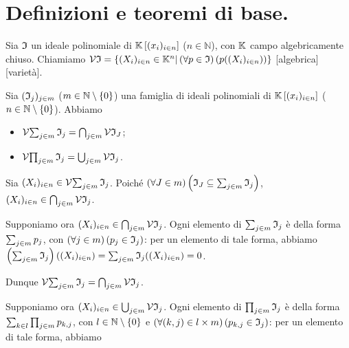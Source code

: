 \section{Definizioni e teoremi di base.}
\label{VarietaAlgebriche_DefinizioniETeoremiDiBase}
\begin{Definition}
	Sia $\mathfrak{I}$ un ideale polinomiale di $\mathbb{K} \left [ (x_i)_{i \in n} \right ]$ ($n \in \mathbb{N}$), con $\mathbb{K}$ campo algebricamente chiuso. Chiamiamo $\AlgebraicManifold{\PolynomialIdeal} = \lbrace (X_i)_{i \in n} \in \Field^n | \ForAll{\Polynomial \in \PolynomialIdeal}{\Polynomial((X_i)_{i \in n})} \rbrace$ [algebrica][variet\`a].
\end{Definition}
\begin{Theorem}
	Sia $(\mathfrak{I}_j)_{j \in m}$ ($m \in \mathbb{N} \setminus \lbrace 0 \rbrace$) una famiglia di ideali polinomiali di $\mathbb{K} \left [ (x_i)_{i \in n} \right ]$ ($n \in \mathbb{N} \setminus \lbrace 0 \rbrace$). Abbiamo
	\begin{itemize}
		\item $\AlgebraicManifold{\sum_{j \in m} \PolynomialIdeal_j} = \bigcap_{j \in m} \AlgebraicManifold{\PolynomialIdeal_J}$;
		\item $\AlgebraicManifold{\prod_{j \in m} \PolynomialIdeal_j} = \bigcup_{j \in m} \AlgebraicManifold{\PolynomialIdeal_j}$.
	\end{itemize}
\end{Theorem}
\Proof Sia $(X_i)_{i \in n} \in \AlgebraicManifold{\sum_{j \in m} \PolynomialIdeal_j}$. Poich\'e $\left ( \forall J \in m \right ) \left ( \mathfrak{I}_J \subseteq \sum_{j \in m} \mathfrak{I}_j \right )$, $(X_i)_{i \in n} \in \bigcap_{j \in m} \AlgebraicManifold{\PolynomialIdeal_j}$.
\par Supponiamo ora $(X_i)_{i \in n} \in \bigcap_{j \in m} \AlgebraicManifold{\PolynomialIdeal_j}$. Ogni elemento di $\sum_{j \in m} \mathfrak{I}_j$ \`e della forma $\sum_{j \in m} p_j$, con $\left ( \forall j \in m \right ) \left ( p_j \in \mathfrak{I}_j \right )$: per un elemento di tale forma, abbiamo $\left ( \sum_{j \in m} \mathfrak{I}_j \right )((X_i)_{i \in n}) = \sum_{j \in m} \mathfrak{I}_j((X_i)_{i \in n}) = 0$.
\par Dunque $\AlgebraicManifold{\sum_{j \in m} \PolynomialIdeal_j} = \bigcap_{j \in m} \AlgebraicManifold{\PolynomialIdeal_j}$.
\par Supponiamo ora $(X_i)_{i \in n} \in \bigcup_{j \in m} \AlgebraicManifold{\PolynomialIdeal_j}$. Ogni elemento di $\prod_{j \in m} \mathfrak{I}_j$ \`e della forma $\sum_{k \in l} \prod_{j \in m} p_{k,j}$, con $l \in \mathbb{N} \setminus \lbrace 0 \rbrace$ e $\left ( \forall (k,j) \in l \times m \right ) \left ( p_{k,j} \in \mathfrak{I}_j \right )$: per un elemento di tale forma, abbiamo
